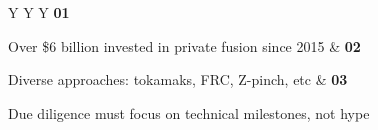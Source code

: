 \documentclass[10pt,a4paper]{article}
\begin{document}
\vspace{5pt}\noindent\begin{tabularx}{\linewidth}{Y Y Y}
{\textcolor{BOGreen}{\bfseries 01}}\par{\scriptsize\color{BOText} Over \$6 billion invested in private fusion since 2015} & {\textcolor{BOGreen}{\bfseries 02}}\par{\scriptsize\color{BOText} Diverse approaches: tokamaks, FRC, Z-pinch, etc} & {\textcolor{BOGreen}{\bfseries 03}}\par{\scriptsize\color{BOText} Due diligence must focus on technical milestones, not hype} \\
\end{tabularx}\par\vspace{2pt}
\label{chap:3:end}
\end{document}
